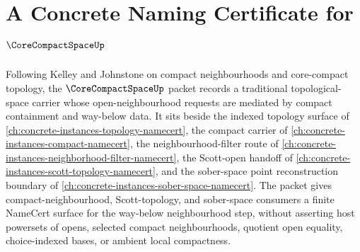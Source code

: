 \chapter{A Concrete Naming Certificate for $\CoreCompactSpaceUp$}
\label{ch:concrete-instances-core-compact-space-namecert}

Following Kelley and Johnstone on compact neighbourhoods and core-compact topology, the $\CoreCompactSpaceUp$ packet records a traditional topological-space carrier whose open-neighbourhood requests are mediated by compact containment and way-below data. It sits beside the indexed topology surface of \autoref{ch:concrete-instances-topology-namecert}, the compact carrier of \autoref{ch:concrete-instances-compact-namecert}, the neighbourhood-filter route of \autoref{ch:concrete-instances-neighborhood-filter-namecert}, the Scott-open handoff of \autoref{ch:concrete-instances-scott-topology-namecert}, and the sober-space point reconstruction boundary of \autoref{ch:concrete-instances-sober-space-namecert}. The packet gives compact-neighbourhood, Scott-topology, and sober-space consumers a finite NameCert surface for the way-below neighbourhood step, without asserting host powersets of opens, selected compact neighbourhoods, quotient open equality, choice-indexed bases, or ambient local compactness.

